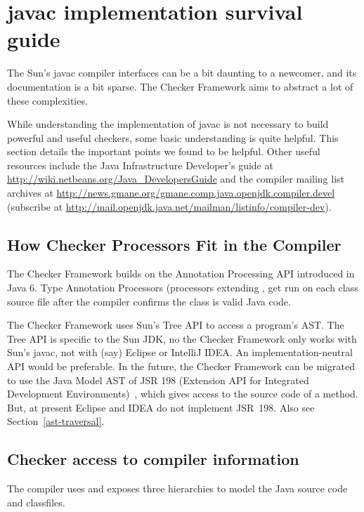 \section{javac implementation survival guide\label{javac-tips}}

The Sun's javac compiler interfaces can be a bit daunting to a
newcomer, and its documentation is a bit sparse. The Checker Framework
aims to abstract a lot of these complexities.

While understanding the implementation of javac is not necessary to
build powerful and useful checkers, some basic understanding is quite
helpful. This section details the important points we found to be
helpful. Other useful resources include the Java Infrastructure
Developer's guide at
\url{http://wiki.netbeans.org/Java_DevelopersGuide} and the compiler
mailing list archives at
\url{http://news.gmane.org/gmane.comp.java.openjdk.compiler.devel}
(subscribe at
\url{http://mail.openjdk.java.net/mailman/listinfo/compiler-dev}).

\subsection{How Checker Processors Fit in the Compiler}

The Checker Framework builds on the Annotation Processing API
introduced in Java 6. Type Annotation Processors (processors extending
, get run on each class
source file after the compiler confirms the class is valid Java code.

The Checker Framework uses Sun's Tree API to access a program's AST\@.
The Tree API is specific to the Sun JDK, no the Checker Framework only
works with Sun's javac, not with (say) Eclipse or IntelliJ IDEA\@.
An implementation-neutral API would be preferable.
In the future, the Checker Framework
can be migrated to use the Java Model AST of JSR 198 (Extension API for
Integrated Development Environments)~\cite{JSR198}, which gives access to
the source code of a method.  But, at present Eclipse and IDEA do not
implement JSR~198.  Also see Section~\ref{ast-traversal}.

\subsection{Checker access to compiler information}

The compiler uses and exposes three hierarchies to model the Java
source code and classfiles.

